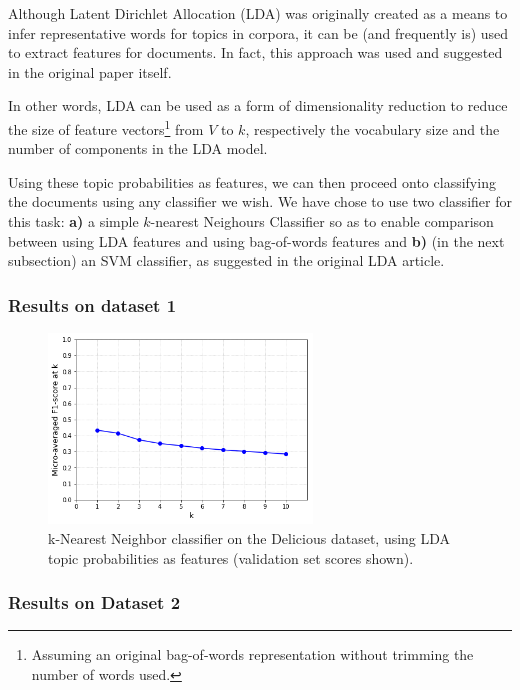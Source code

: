 Although Latent Dirichlet Allocation (LDA) \citep{blei_etal_2003} was originally created as a means to infer representative words for topics in corpora, it can be (and frequently is) used to extract features for documents. In fact, this approach was used and suggested in the original paper itself.

In other words, LDA can be used as a form of dimensionality reduction to reduce the size of feature vectors\footnote{Assuming an original bag-of-words representation without trimming the number of words used.} from $V$ to $k$, respectively the vocabulary size and the number of components in the LDA model.

Using these topic probabilities as features, we can then proceed onto classifying the documents using any classifier we wish. We have chose to use two classifier for this task: \textbf{a)} a simple $k$-nearest Neighours Classifier so as to enable comparison between using LDA features and using bag-of-words features and \textbf{b)} (in the next subsection) an SVM classifier, as suggested in the original LDA article.

\subsubsection{Results on dataset 1}

\begin{figure}[H]
    \centering
    \includegraphics[width=7cm]{chapters/05_experiments/images/knn-lda-delicious.png}
    \caption{k-Nearest Neighbor classifier on the Delicious dataset, using LDA topic probabilities as features (validation set scores shown).}
    \label{fig:knn_lda_delicious}
\end{figure}

\subsubsection{Results on Dataset 2}

